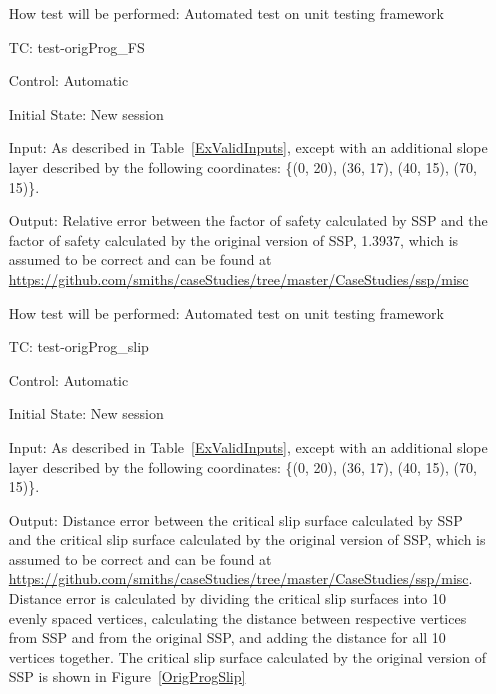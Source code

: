 \documentclass[12pt, titlepage]{article}
\newcounter{testnum} %
\newcommand{\progname}{SSP}
\begin{document}
\begin{enumerate}[label=TC\arabic*:,ref={\arabic*}]
How test will be performed: Automated test on unit testing framework

\item [TC\refstepcounter{testnum}\thetestnum: \label{TC_OrigProgFS}] 
test-origProg\_FS

Control: Automatic

Initial State: New session

Input: As described in Table~\ref{ExValidInputs}, except with an additional 
slope layer described by the following coordinates: \{(0, 20), (36, 17), (40, 
15), (70, 15)\}.

Output: Relative error between the factor of safety calculated by \progname{} 
and the factor of safety calculated by the original version of \progname{}, 
1.3937, which is assumed to be correct and can be found at \newline
\href{https://github.com/smiths/caseStudies/tree/master/CaseStudies/ssp/misc}
{https://github.com/smiths/caseStudies/tree/master/CaseStudies/ssp/misc}

How test will be performed: Automated test on unit testing framework

\item [TC\refstepcounter{testnum}\thetestnum: \label{TC_OrigProgSlip}] 
test-origProg\_slip

Control: Automatic

Initial State: New session

Input: As described in Table~\ref{ExValidInputs}, except with an additional 
slope layer described by the following coordinates: \{(0, 20), (36, 17), (40, 
15), (70, 15)\}.

Output: Distance error between the critical slip surface calculated by 
\progname{} and the critical slip surface calculated by the original version of 
\progname{}, which is assumed to be correct and can be found at \newline
\href{https://github.com/smiths/caseStudies/tree/master/CaseStudies/ssp/misc}
{https://github.com/smiths/caseStudies/tree/master/CaseStudies/ssp/misc}. 
Distance error is calculated by dividing the critical slip surfaces into 10 
evenly spaced vertices, calculating the distance between respective vertices 
from \progname{} and from the original \progname{}, and adding the distance for 
all 10 vertices together. The critical slip surface calculated by the original 
version of SSP is shown in Figure~\ref{OrigProgSlip}


\end{enumerate}
\end{document}
